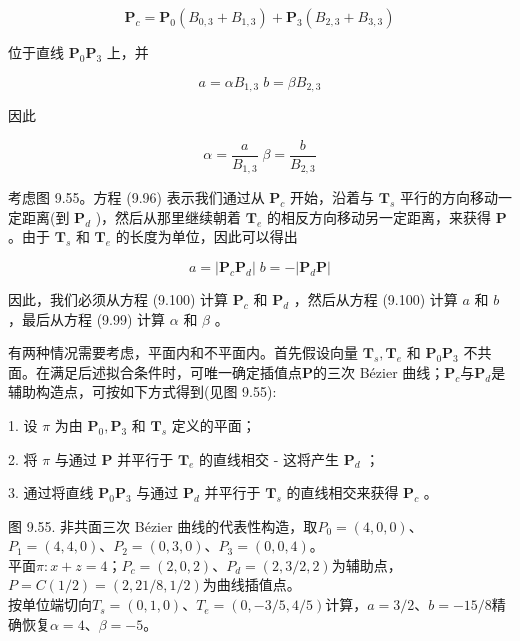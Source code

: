\documentclass[../main.tex]{subfiles}
\begin{document}
\[
{\mathbf{P}}_{c} = {\mathbf{P}}_{0}\left( {{B}_{0,3} + {B}_{1,3}}\right)  + {\mathbf{P}}_{3}\left( {{B}_{2,3} + {B}_{3,3}}\right)  \tag{9.97}
\]

位于直线 \({\mathbf{P}}_{0}{\mathbf{P}}_{3}\) 上，并

\[
a = \alpha {B}_{1,3}\;b = \beta {B}_{2,3} \tag{9.98}
\]

因此

\[
\alpha  = \frac{a}{{B}_{1,3}}\;\beta  = \frac{b}{{B}_{2,3}} \tag{9.99}
\]

考虑图 9.55。方程 (9.96) 表示我们通过从 \({\mathbf{P}}_{c}\) 开始，沿着与 \({\mathbf{T}}_{s}\) 平行的方向移动一定距离(到 \({\mathbf{P}}_{d}\) )，然后从那里继续朝着 \({\mathbf{T}}_{e}\) 的相反方向移动另一定距离，来获得 \(\mathbf{P}\) 。由于 \({\mathbf{T}}_{s}\) 和 \({\mathbf{T}}_{e}\) 的长度为单位，因此可以得出

\[
a = \left| {{\mathbf{P}}_{c}{\mathbf{P}}_{d}}\right| \;b =  - \left| {{\mathbf{P}}_{d}\mathbf{P}}\right|  \tag{9.100}
\]

因此，我们必须从方程 (9.100) 计算 \({\mathbf{P}}_{c}\) 和 \({\mathbf{P}}_{d}\) ，然后从方程 (9.100) 计算 \(a\) 和 \(b\) ，最后从方程 (9.99) 计算 \(\alpha\) 和 \(\beta\) 。

有两种情况需要考虑，平面内和不平面内。首先假设向量 \({\mathbf{T}}_{s},{\mathbf{T}}_{e}\) 和 \({\mathbf{P}}_{0}{\mathbf{P}}_{3}\) 不共面。在满足后述拟合条件时，可唯一确定插值点\(\mathbf P\)的三次 Bézier 曲线；\(\mathbf P_c\)与\(\mathbf P_d\)是辅助构造点，可按如下方式得到(见图 9.55):



1. 设 \(\pi\) 为由 \({\mathbf{P}}_{0},{\mathbf{P}}_{3}\) 和 \({\mathbf{T}}_{s}\) 定义的平面；

2. 将 \(\pi\) 与通过 \(\mathbf{P}\) 并平行于 \({\mathbf{T}}_{e}\) 的直线相交 - 这将产生 \({\mathbf{P}}_{d}\) ；

3. 通过将直线 \({\mathbf{P}}_{0}{\mathbf{P}}_{3}\) 与通过 \({\mathbf{P}}_{d}\) 并平行于 \({\mathbf{T}}_{s}\) 的直线相交来获得 \({\mathbf{P}}_{c}\) 。

\begin{center}
\begin{minipage}{26cm}
\vspace*{.6\baselineskip}
\centering
{}
\par\smallskip
图 9.55. 非共面三次 Bézier 曲线的代表性构造，取$P_0=(4,0,0)$、$P_1=(4,4,0)$、$P_2=(0,3,0)$、$P_3=(0,0,4)$。\\
平面$\pi:x+z=4$；$P_c=(2,0,2)$、$P_d=(2,3/2,2)$为辅助点，$P=C(1/2)=(2,21/8,1/2)$为曲线插值点。\\
按单位端切向$T_s=(0,1,0)$、$T_e=(0,-3/5,4/5)$计算，$a=3/2$、$b=-15/8$精确恢复$\alpha=4$、$\beta=-5$。
\end{minipage}
\end{center}
\end{document}
